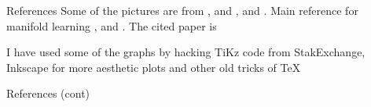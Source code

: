 \documentclass{beamer}
\begin{document}
\begin{frame}{References}
	Some of the pictures are from \citep{docarmoriemann}, and \citep{schutz}, and \citep{geron2}. Main reference for manifold learning \citep{rabadan}, and \citep{murphyintro}. The cited paper is \citep{lawrenceman}
	
	I have used some of the graphs by hacking TiKz code from StakExchange, Inkscape for more aesthetic plots and other old tricks of \TeX
\end{frame}
\begin{frame}{References (cont)}
	
	\printbibliography 	
	
	
	
\end{frame}


	
\end{document}
